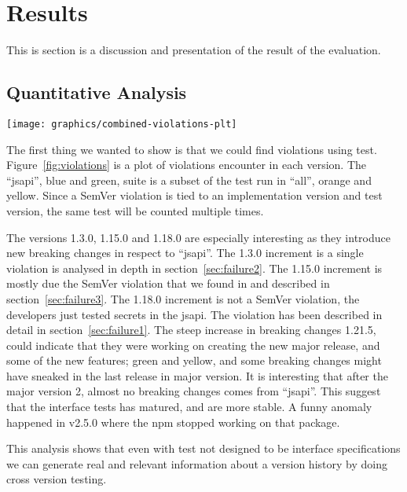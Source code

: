 \section{Results}

This is section is a discussion and presentation of the result of the
evaluation.

\subsection{Quantitative Analysis}

\begin{figure*}
\centering
\texttt{[image: graphics/combined-violations-plt]}
\caption{Violations per version. ``jsapi'' is a subset of violations found in ``all''}
\label{fig:violations}
\end{figure*}

The first thing we wanted to show is that we could find violations using test.
Figure~\ref{fig:violations} is a plot of violations encounter in each version.
The ``jsapi'', blue and green, suite is a subset of the test run in ``all'', orange and
yellow. Since a SemVer violation is tied to an implementation version and test version, the same test
will be counted multiple times.

The versions 1.3.0, 1.15.0 and 1.18.0 are especially interesting as they
introduce new breaking changes in respect to ``jsapi''.  The 1.3.0 increment is
a single violation is analysed in depth in section~\ref{sec:failure2}. The
1.15.0 increment is mostly due the SemVer violation that we found in and
described in section~\ref{sec:failure3}. The 1.18.0 increment is not a
SemVer violation, the developers just tested secrets in the jsapi.
The violation has been described in detail in section~\ref{sec:failure1}. The
steep increase in breaking changes 1.21.5, could indicate that they were working
on creating the new major release, and some of the new features; green and
yellow, and some breaking changes might have sneaked in the last release in major
version. It is interesting that after the major version 2, almost no breaking
changes comes from ``jsapi''. This suggest that the interface tests has
matured, and are more stable. A funny anomaly happened in v2.5.0 where the npm
stopped working on that package.

This analysis shows that even with test not designed to be interface
specifications we can generate real and relevant information about a 
version history by doing cross version testing.

